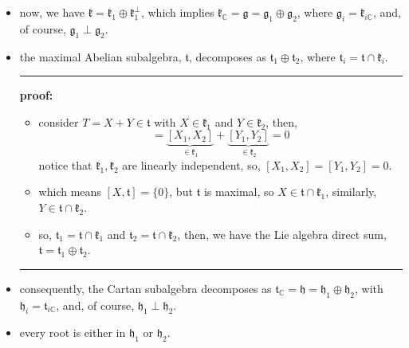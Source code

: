 \begin{itemize}
\begin{tcolorbox}[title=proof:]
\begin{itemize}
			\item now, we have $\mathfrak{k} = \mathfrak{k}_1 \oplus \mathfrak{k}_1^\perp$, which implies $\mathfrak{k}_\mathbb{C} = \mathfrak{g} = \mathfrak{g}_1 \oplus \mathfrak{g}_2$, where $\mathfrak{g}_i = \mathfrak{k}_{i \mathbb{C}}$, and, of course, $\mathfrak{g}_1 \perp \mathfrak{g}_2$.
			
			\item the maximal Abelian subalgebra, $\mathfrak{t}$, decomposes as $\mathfrak{t}_1 \oplus \mathfrak{t}_2$, where $\mathfrak{t}_i = \mathfrak{t} \cap \mathfrak{k}_i$.
			
			\noindent\rule[0.5ex]{\linewidth}{0.5pt} %
			
			\textbf{proof:}
			
			\begin{itemize}
				\item consider $T = X + Y \in \mathfrak{t}$ with $X \in \mathfrak{k}_1$ and $Y \in \mathfrak{k}_2$, then,
				\begin{equation}
					[T_1, T_2] = \underbrace{[X_1, X_2]}_{\in \mathfrak{k}_1} + \underbrace{[Y_1, Y_2]}_{\in \mathfrak{k}_2} = 0
				\end{equation}
				notice that $\mathfrak{k}_1, \mathfrak{k}_2$ are linearly independent, so, $[X_1, X_2] = [Y_1, Y_2] = 0$.
				
				\item which means $[X, \mathfrak{t}] = \{0\}$, but $\mathfrak{t}$ is maximal, so $X \in \mathfrak{t} \cap \mathfrak{k}_1$, similarly, $Y \in \mathfrak{t} \cap \mathfrak{k}_2$.
				
				\item so, $\mathfrak{t}_1 = \mathfrak{t} \cap \mathfrak{k}_1$ and $\mathfrak{t}_2 = \mathfrak{t} \cap \mathfrak{k}_2$, then, we have the Lie algebra direct sum, $\mathfrak{t} = \mathfrak{t}_1 \oplus \mathfrak{t}_2$.
			\end{itemize}
			
			\noindent\rule[0.5ex]{\linewidth}{0.5pt} %
			
			\item consequently, the Cartan subalgebra decomposes as $\mathfrak{t}_\mathbb{C} = \mathfrak{h} = \mathfrak{h}_1 \oplus \mathfrak{h}_2$, with $\mathfrak{h}_i = \mathfrak{t}_{i \mathbb{C}}$, and, of course, $\mathfrak{h}_1 \perp \mathfrak{h}_2$.
			
			\item every root is either in $\mathfrak{h}_1$ or $\mathfrak{h}_2$.
			

\end{itemize}
\end{tcolorbox}
\end{itemize}

